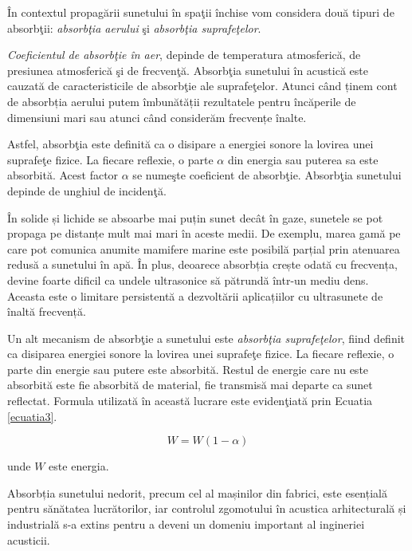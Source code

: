 	\^{I}n contextul propag\u{a}rii sunetului \^{i}n spa\c{t}ii \^{i}nchise vom considera dou\u{a} tipuri de absorb\c{t}ii: \textit{absorb\c{t}ia aerului} \c{s}i \textit{absorb\c{t}ia suprafe\c{t}elor}.
	 
	
	\textit{Coeficientul de absorb\c{t}ie \^{i}n aer}, depinde de temperatura atmosferic\u{a}, de presiunea atmosferic\u{a} \c{s}i de frecven\c{t}\u{a}. Absorb\c{t}ia sunetului \^{i}n acustic\u{a} este cauzat\u{a} de caracteristicile de absorb\c{t}ie ale suprafe\c{t}elor. Atunci când ținem cont de absorbția aerului putem îmbunătății rezultatele pentru încăperile de dimensiuni mari sau atunci când considerăm frecvențe înalte.
	
	Astfel, absorb\c{t}ia este definit\u{a} ca o disipare a energiei sonore la lovirea unei suprafe\c{t}e fizice. La fiecare reflexie, o parte $\alpha$ din energia sau puterea sa este absorbit\u{a}. Acest factor $\alpha$ se nume\c{s}te coeficient de absorb\c{t}ie. Absorb\c{t}ia sunetului depinde de unghiul de inciden\c{t}\u{a}.
	
	În solide și lichide se absoarbe mai puțin sunet decât în gaze, sunetele se pot propaga pe distanțe mult mai mari în aceste medii. De exemplu, marea gamă pe care pot comunica anumite mamifere marine este posibilă parțial prin atenuarea redusă a sunetului în apă. În plus, deoarece absorbția crește odată cu frecvența, devine foarte dificil ca undele ultrasonice să pătrundă într-un mediu dens. Aceasta este o limitare persistentă a dezvoltării aplicațiilor cu ultrasunete de înaltă frecvență.
	
	Un alt mecanism de absorb\c{t}ie a sunetului este \textit{absorb\c{t}ia suprafe\c{t}elor}, fiind definit ca disiparea energiei sonore la lovirea unei suprafe\c{t}e fizice. La fiecare reflexie, o parte din energie sau putere este absorbit\u{a}. Restul de energie care nu este absorbit\u{a} este fie absorbit\u{a} de material, fie transmis\u{a} mai departe ca sunet reflectat. Formula utilizat\u{a} \^{i}n aceast\u{a} lucrare este eviden\c{t}iat\u{a} prin Ecuatia \eqref{ecuatia3}.
	
	\begin{equation}
		W = W(1-\alpha)
		\label{ecuatia3}
	\end{equation}
	
	\noindent unde $W$ este energia.
	
	Absorbția sunetului nedorit, precum cel al mașinilor din fabrici, este esențială pentru sănătatea lucrătorilor, iar controlul zgomotului în acustica arhitecturală și industrială s-a extins pentru a deveni un domeniu important al ingineriei acusticii.
	
